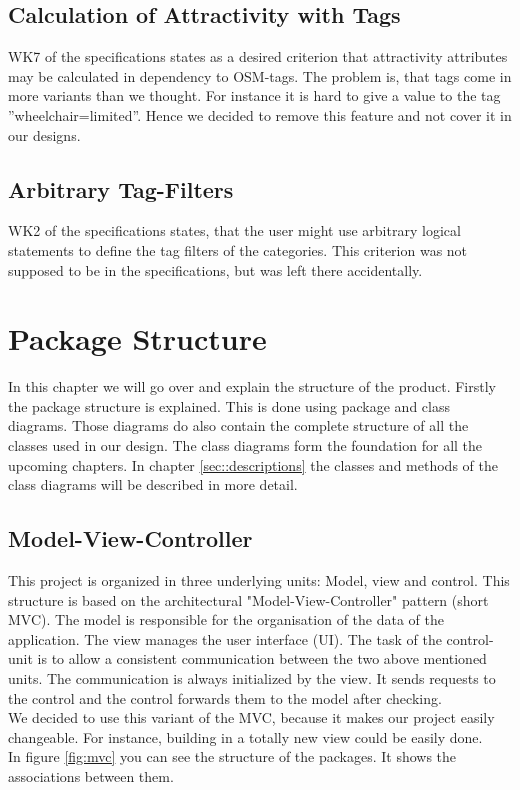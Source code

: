 \documentclass[letterpaper,10pt,english]{sphinxmanual}
\begin{document}
\section{Calculation of Attractivity with Tags}
WK7 of the specifications states as a desired criterion that attractivity attributes may be calculated in dependency to OSM-tags. The problem is, that tags come in more variants than we thought. For instance it is hard to give a value to the tag ''wheelchair=limited''. Hence we decided to remove this feature and not cover it in our designs.

\section{Arbitrary Tag-Filters}
WK2 of the specifications states, that the user might use arbitrary logical statements to define the tag filters of the categories. This criterion was not supposed to be in the specifications, but was left there accidentally.

\chapter{Package Structure}
\label{\detokenize{index:requirement-changes}}
\sphinxstepscope

In this chapter we will go over and explain the structure of the product. Firstly the package structure is explained. This is done using package and class diagrams. Those diagrams do also contain the complete structure of all the classes used in our design. The class diagrams form the foundation for all the upcoming chapters. In chapter \ref{sec::descriptions} the classes and methods of the class diagrams will be described in more detail.

\section{Model-View-Controller} \label{sec::mvc}
This project is organized in three underlying units: Model, view and control. This structure is based on the architectural "Model-View-Controller" pattern (short MVC). 
The model is responsible for the organisation of the data of the application. The view manages the user interface (UI). The task of the control-unit is to allow a consistent communication between the two above mentioned units. The communication is always initialized by the view. It sends requests to the control and the control forwards them to the model after checking.\\
We decided to use this variant of the MVC, because it makes our project easily changeable. For instance, building in a totally new view could be easily done.\\
In figure \ref{fig:mvc} you can see the structure of the packages. It shows the associations between them.
\end{document}
